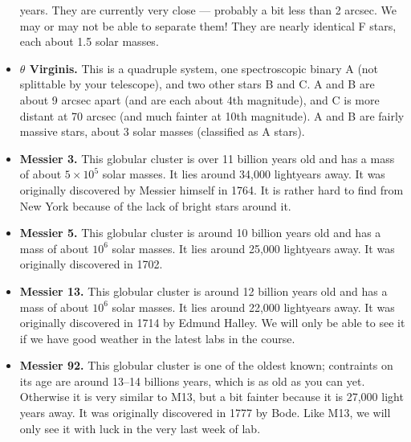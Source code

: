 \begin{itemize}
  years. They are currently very close --- probably a bit less than 2
  arcsec. We may or may not be able to separate them! They are nearly
  identical F stars, each about 1.5 solar masses.
\item {\bf $\theta$ Virginis.} This is a quadruple system, one
  spectroscopic binary A (not splittable by your telescope), and two
  other stars B and C. A and B are about 9 arcsec apart (and are each
  about 4th magnitude), and C is more distant at 70 arcsec (and much
  fainter at 10th magnitude). A and B are fairly massive stars, about
  3 solar masses (classified as A stars).
\item {\bf Messier 3.}
  This globular cluster is over 11 billion years old and has a mass of
  about $5\times 10^5$ solar masses. It lies around 34,000 lightyears
  away. It was originally discovered by Messier himself in 1764. It is
  rather hard to find from New York because of the lack of bright
  stars around it.
\item {\bf Messier 5.}
  This globular cluster is around 10 billion years old and has a mass
  of about $10^6$ solar masses. It lies around 25,000 lightyears
  away. It was originally discovered in 1702.
\item {\bf Messier 13.}
  This globular cluster is around 12 billion years old and has a mass
  of about $10^6$ solar masses. It lies around 22,000 lightyears
  away. It was originally discovered in 1714 by Edmund Halley. We will
  only be able to see it if we have good weather in the latest labs in
  the course. 
\item {\bf Messier 92.}
  This globular cluster is one of the oldest known; contraints on its
  age are around 13--14 billions years, which is as old as you can
  yet. Otherwise it is very similar to M13, but a bit fainter because
  it is 27,000 light years away. It was originally discovered in 1777
  by Bode. Like M13, we will only see it with luck in the very last
  week of lab.
\end{itemize}
